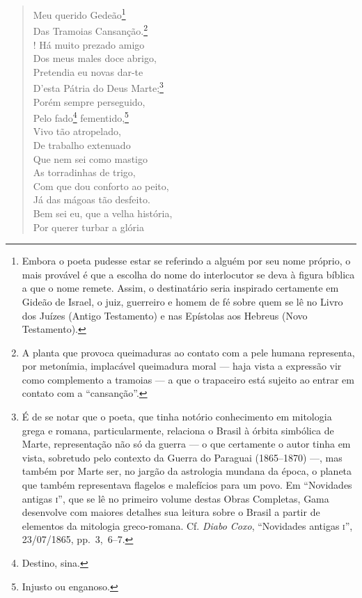 \begin{verse}
Meu querido Gedeão\footnote{ Embora o poeta pudesse estar se
  referindo a alguém por seu nome próprio, o mais provável é que a
  escolha do nome do interlocutor se deva à figura bíblica a que o nome
  remete. Assim, o destinatário seria inspirado certamente em Gideão de
  Israel, o juiz, guerreiro e homem de fé sobre quem se lê no Livro dos
  Juízes (Antigo Testamento) e nas Epístolas aos Hebreus (Novo
  Testamento).}\\
Das Tramoias Cansanção.\footnote{ A planta que provoca queimaduras ao
  contato com a pele humana representa, por metonímia, implacável
  queimadura moral --- haja vista a expressão vir como complemento a
  tramoias --- a que o trapaceiro está sujeito ao entrar em contato com a
  ``cansanção''.}\\!
Há muito prezado amigo\\
Dos meus males doce abrigo,\\
Pretendia eu novas dar-te\\
D'esta Pátria do Deus Marte;\footnote{ É de se notar que o poeta, que
  tinha notório conhecimento em mitologia grega e romana,
  particularmente, relaciona o Brasil à órbita simbólica de Marte,
  representação não só da guerra --- o que certamente o autor tinha em
  vista, sobretudo pelo contexto da Guerra do Paraguai (1865--1870) ---,
  mas também por Marte ser, no jargão da astrologia mundana da época, o
  planeta que também representava flagelos e malefícios para um povo. Em
  ``Novidades antigas \textsc{i}'', que se lê no primeiro volume destas
  Obras Completas, Gama desenvolve com maiores detalhes sua leitura
  sobre o Brasil a partir de elementos da mitologia greco-romana. Cf.
  \emph{Diabo Coxo}, ``Novidades antigas \textsc{i}'', 23/07/1865, pp.~3,~6--7.}\\
Porém sempre perseguido,\\
Pelo fado\footnote{ Destino, sina.} fementido,\footnote{ Injusto
  ou enganoso.}\\
Vivo tão atropelado,\\
De trabalho extenuado\\
Que nem sei como mastigo\\
As torradinhas de trigo,\\
Com que dou conforto ao peito,\\
Já das mágoas tão desfeito.\\
Bem sei eu, que a velha história,\\
Por querer turbar a glória\\

\end{verse}
